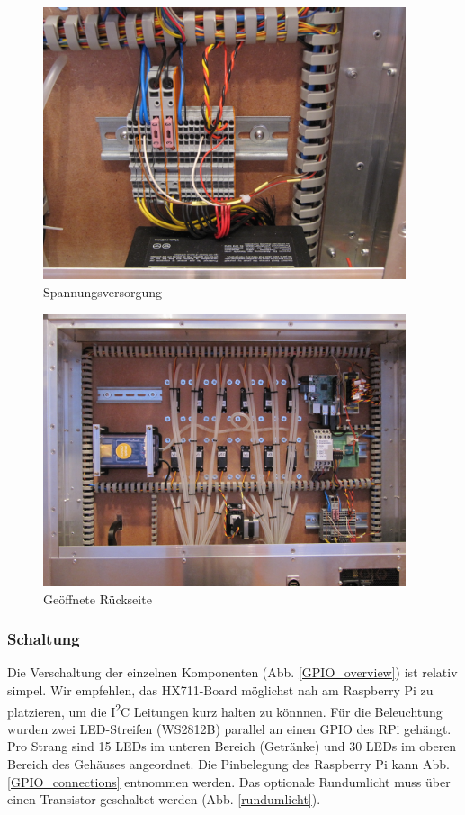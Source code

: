 \documentclass[a4paper]{scrartcl}
\begin{document}
\begin{figure}
  \centering
  \includegraphics[height=8cm]{pics/psu}
  \caption{Spannungsversorgung} \label{psu}
\end{figure}

\begin{figure}
  \centering
  \includegraphics[height=8cm]{pics/electronic_overview}
  \caption{Geöffnete Rückseite} \label{electronic_overview}
\end{figure}

\subsubsection{Schaltung}
Die Verschaltung der einzelnen Komponenten (Abb. \ref{GPIO_overview}) ist relativ simpel. Wir empfehlen, das HX711-Board möglichst nah am Raspberry Pi zu platzieren, um die I\textsuperscript{2}C Leitungen kurz halten zu könnnen. Für die Beleuchtung wurden zwei LED-Streifen (WS2812B) parallel an einen GPIO des RPi gehängt. Pro Strang sind 15 LEDs im unteren Bereich (Getränke) und 30 LEDs im oberen Bereich des Gehäuses angeordnet. Die Pinbelegung des Raspberry Pi kann Abb. \ref{GPIO_connections} entnommen werden. Das optionale Rundumlicht muss über einen Transistor geschaltet werden (Abb. \ref{rundumlicht}).  
\end{document}
